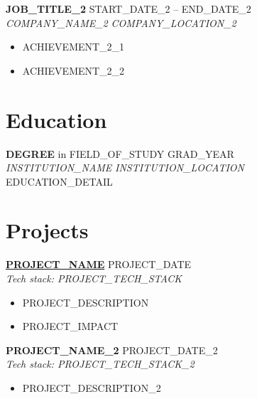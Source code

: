 \documentclass[11pt,letterpaper]{article}
\begin{document}
\vspace{4pt}

\textbf{{{JOB_TITLE_2}}} \hfill {{START_DATE_2}} -- {{END_DATE_2}} \\
\textit{{{COMPANY_NAME_2}}} \hfill \textit{{{COMPANY_LOCATION_2}}}
\begin{itemize}
  \item {{ACHIEVEMENT_2_1}}
  \item {{ACHIEVEMENT_2_2}}
\end{itemize}

\section{Education}

\textbf{{{DEGREE}}} in {{FIELD_OF_STUDY}} \hfill {{GRAD_YEAR}} \\
\textit{{{INSTITUTION_NAME}}} \hfill \textit{{{INSTITUTION_LOCATION}}} \\
{{EDUCATION_DETAIL}}

\section{Projects}

\textbf{\href{{{PROJECT_URL}}}{{{PROJECT_NAME}}}} \hfill {{PROJECT_DATE}} \\
\textit{Tech stack: {{PROJECT_TECH_STACK}}}
\begin{itemize}
  \item {{PROJECT_DESCRIPTION}}
  \item {{PROJECT_IMPACT}}
\end{itemize}

\vspace{4pt}

\textbf{{{PROJECT_NAME_2}}} \hfill {{PROJECT_DATE_2}} \\
\textit{Tech stack: {{PROJECT_TECH_STACK_2}}}
\begin{itemize}
  \item {{PROJECT_DESCRIPTION_2}}
\end{itemize}
\end{document}
